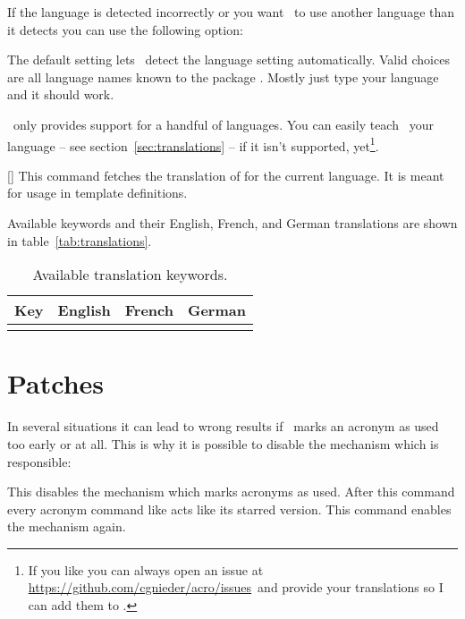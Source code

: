 \documentclass{acro-manual}
\newcommand*\issues{\url{https://github.com/cgnieder/acro/issues}}
\begin{document}
If the language is detected incorrectly or you want \acro\ to use another
language than it detects you can use the following option:
\begin{options}
    The default setting  lets \acro\ detect the language setting
    automatically. Valid choices are all language names known to the package
    . Mostly just type your language and it should work.
\end{options}
\acro\ only provides support for a handful of languages.  You can easily teach
\acro\ your language -- see section~\vref{sec:translations} -- if it isn't
supported, yet\footnote{If you like you can always open an issue at \issues\
  and provide your translations so I can add them to \acro.}.
\begin{commands}
  \expandable{}[]
    This command fetches the translation of  for the current
    language.  It is meant for usage in template definitions.
\end{commands}

Available keywords and their English, French, and German translations are
shown in table~\vref{tab:translations}.

\begin{table}
  \centering
  \begin{tabular}{llll}
    \toprule
      \bfseries Key & \bfseries English & \bfseries French & \bfseries German \\
    \midrule
      \translationtable
    \bottomrule
  \end{tabular}
  \caption{Available translation keywords.}
  \label{tab:translations}
\end{table}

\section{Patches}\label{sec:patches}
In several situations it can lead to wrong results if \acro\ marks an acronym
as used too early or at all.  This is why it is possible to disable the
mechanism which is responsible:
\begin{commands}
    This disables the mechanism which marks acronyms as used. After this
    command every acronym command like \cs{ac} acts like its starred version.
  \command{acswitchon}
    This command enables the mechanism again.
\end{commands}
\end{document}
